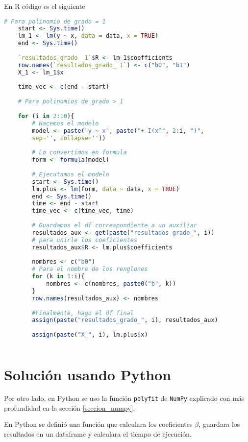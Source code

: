 En \textsf{R} código es el siguiente

\begin{lstlisting}[language=R]
	# Para polinomio de grado = 1
	start <- Sys.time()
	lm_1 <- lm(y ~ x, data = data, x = TRUE)
	end <- Sys.time()
	
	`resultados_grado_ 1`$R <- lm_1$coefficients
	row.names(`resultados_grado_ 1`) <- c("b0", "b1")
	X_1 <- lm_1$x
	
	time_vec <- c(end - start)
	
	# Para polinomios de grado > 1
	
	for (i in 2:10){
		# Hacemos el modelo
		model <- paste("y ~ x", paste("+ I(x^", 2:i, ")", 
		sep='', collapse=''))
		
		# Lo convertimos en formula
		form <- formula(model)
		
		# Ejecutamos el modelo
		start <- Sys.time()
		lm.plus <- lm(form, data = data, x = TRUE)
		end <- Sys.time()
		time <- end - start
		time_vec <- c(time_vec, time)
		
		# Guardamos el df correspondiente a un auxiliar
		resultados_aux <- get(paste("resultados_grado_", i))
		# para unirle los coeficientes
		resultados_aux$R <- lm.plus$coefficients
		
		nombres <- c("b0")
		# Para el nombre de los renglones
		for (k in 1:i){
			nombres <- c(nombres, paste0("b", k))
		}
		row.names(resultados_aux) <- nombres
		
		#Finalmente, hago el df final
		assign(paste("resultados_grado_", i), resultados_aux)
		
		assign(paste("X_", i), lm.plus$x)
		
	\end{lstlisting}

\section{Solución usando Python}

Por otro lado, en \textsf{Python} se uso la función \texttt{polyfit} de \texttt{NumPy} explicado con más profundidad en la sección \ref{seccion_numpy}. 

En \textsf{Python} se definió una función que calculara los coeficientes $\beta$, guardara los resultados en un dataframe y calculara el tiempo de ejecución. 

